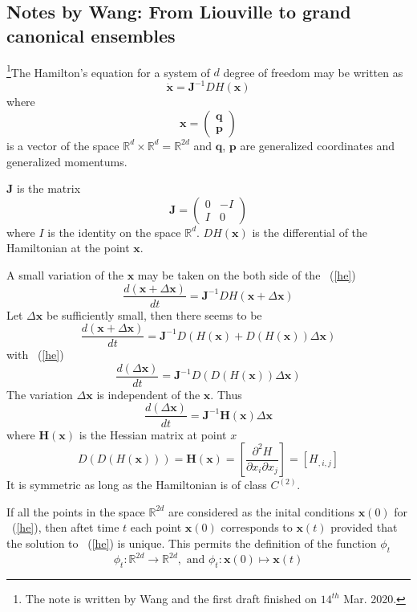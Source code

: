 \subsection{Notes by Wang: From Liouville to grand canonical ensembles}
\def\b#1{\mathbf{#1}}
\def\mref#1{\hspace{-7.5pt} ~(\ref{#1})}
\def\td#1{\frac{d#1}{dt}}
\footnote{The note is written by Wang and the first draft finished on $14^{th}$ Mar. 2020.}The Hamilton's equation for a system of $d$ degree of freedom may be written as
\begin{equation}\label{he}
\dot{\b x}=\b J^{-1}D H(\b x)
\end{equation}
where
\[
    \b x=\begin{pmatrix}\b q\\\b p\end{pmatrix}
    \]
is a vector of the space $\mathbb R^d\times\mathbb R^d=\mathbb R^{2d}$ and $\b q$, $\b p$ are generalized coordinates and generalized momentums.


\noindent $\b J$ is the matrix
\[
    \b J=\begin{pmatrix} 0 & -I\\ I & 0\end{pmatrix}
    \]
where $I$ is the identity on the space $\mathbb R^d$. $DH(\b x)$ is the differential of the Hamiltonian at the point $\b x$.

A small variation of the $\b x$ may be taken on the both side of the \mref{he}
\def\tdb#1{\td{(#1)}}
\def\vd{\Delta}
\[
\tdb{\b x+\Delta\b x}=\b J^{-1}D H(\b x+\Delta\b x)
\]
Let $\vd\b x$ be sufficiently small, then there seems to be
\def\dx{\vd\b x}
\[
\tdb{\b x+\dx}=\b J^{-1}D(H(\b x)+D(H(\b x))\dx)
\]
with \mref{he}
\[
\tdb{\dx}=\b J^{-1}D(D(H(\b x))\dx)
\]
The variation $\dx$ is independent of the $\b x$. Thus
\def\hex{\b H(\b x)}
\begin{equation}\label{vhe}
\tdb{\dx}=\b J^{-1}\hex\dx
\end{equation}
where $\hex$ is the Hessian matrix at point $x$
\[
    D(D(H(\b x)))=\hex=\left[\frac{\partial^2 H}{\partial x_i\partial x_j}\right]=\left[H_{,i,j}\right]
    \]
It is symmetric as long as the Hamiltonian is of class $C^{(2)}$.

If all the points in the space $\mathbb R^{2d}$ are considered as the inital conditions $\b x(0)$ for \mref{he}, then aftet time $t$ each point $\b x(0)$ corresponds to $\b x(t)$ provided that the solution to \mref{he} is unique. This permits the definition of the function $\phi_t$
\[
   \phi_t :  \mathbb R^{2d}\longrightarrow \mathbb R^{2d}, \text{\ \ \ and\ \ \ } \phi_t: \b x(0)\mapsto \b x(t) 
    \]

